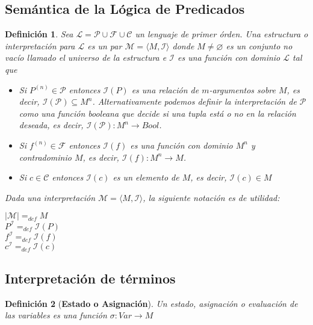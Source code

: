 \documentclass[letterpaper,12pt]{article}
\newtheorem{define}{Definición}[]
\begin{document}
    \subsection{Semántica de la Lógica de Predicados}
    \begin{define}
      Sea $\mathcal{L} = \mathcal{P} \cup \mathcal{F} \cup \mathcal{C}$ un 
      lenguaje de primer órden. Una estructura o interpretación para 
      $\mathcal{L}$ es un par $\mathcal{M} = \langle M, \mathcal{I} \rangle$ 
      donde $M \neq \varnothing$ es un conjunto no vacío llamado el universo 
      de la estructura e $\mathcal{I}$ es una función con dominio $\mathcal{L}$ 
      tal que 
      \begin{itemize}
        \item Si $P^{(n)} \in \mathcal{P}$ entonces $\mathcal{I}(P)$ es una 
        relación de $m$-argumentos sobre $M$, es decir, 
        $\mathcal{I}(\mathcal{P}) \subseteq M^{n}$. Alternativamente podemos 
        definir la interpretación de $\mathcal{P}$ como una función booleana 
        que decide si una tupla está o no en la relación deseada, es decir, 
        $\mathcal{I}(\mathcal{P}): M^{n} \rightarrow Bool$.
        
        \item Si $f^{(n)} \in \mathcal{F}$ entonces $\mathcal{I}(f)$ es una 
        función con dominio $M^{n}$ y contradominio $M$, es decir, 
        $\mathcal{I}(f): M^{n} \rightarrow M$.
        
        \item Si $c \in \mathcal{C}$ entonces $\mathcal{I}(c)$ es un elemento 
        de $M$, es decir, $\mathcal{I}(c) \in M$
      
      \end{itemize}
      
      Dada una interpretación $\mathcal{M} = \langle M,  \mathcal{I} \rangle$, 
      la siguiente notación es de utilidad:
      \begin{center}
        $|\mathcal{M}| =_{def} M$ \\
        $P^{\mathcal{I}} =_{def} \mathcal{I}(P)$ \\
        $f^{\mathcal{I}} =_{def} \mathcal{I}(f)$ \\
        $c^{\mathcal{I}} =_{def} \mathcal{I}(c)$
      \end{center}
    \end{define}

    \subsection{Interpretación de términos}
    \begin{define}[\textbf{Estado o Asignación}]
      Un estado, asignación o evaluación de las variables es una función 
      $\sigma: Var \rightarrow M$
    \end{define}
\end{document}
